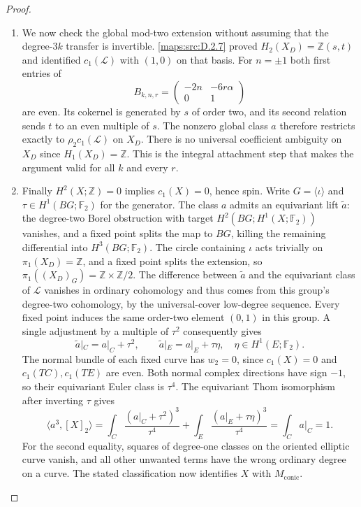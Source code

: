 \begin{proof}
\begin{enumerate}[label=\arabic*.,leftmargin=*]
\item We now check the global mod-two extension without assuming that
the degree-$3k$ transfer is invertible. \ref{maps:src:D.2.7} proved
$H_2(X_D)=\mathbb Z(s,t)$ and identified
$c_1(\mathcal L)$ with $(1,0)$ on that basis.
For $n=\pm1$ both first entries of
\[
 B_{k,n,r}=\begin{pmatrix}-2n&-6r\alpha\\0&1\end{pmatrix}
\]
are even. Its cokernel is generated by $s$ of order two, and
its second relation sends $t$ to an even multiple of $s$.
The nonzero global class $a$ therefore restricts exactly to
$\rho_2c_1(\mathcal L)$ on $X_D$. There is no universal
coefficient ambiguity on $X_D$ since $H_1(X_D)=\mathbb Z$.
This is the integral attachment step that makes the argument
valid for all $k$ and every $r$.

\item Finally $H^2(X;\mathbb Z)=0$ implies $c_1(X)=0$, hence spin.
Write $G=\langle\iota\rangle$ and
$\tau\in H^1(BG;\mathbb F_2)$ for the generator.
The class $a$ admits an equivariant lift $\widetilde a$:
the degree-two Borel obstruction with target
$H^2(BG;H^1(X;\mathbb F_2))$ vanishes, and a fixed point
splits the map to $BG$, killing the remaining differential
into $H^3(BG;\mathbb F_2)$.
The circle containing $\iota$ acts trivially on
$\pi_1(X_D)=\mathbb Z$, and a fixed point splits the extension,
so $\pi_1((X_D)_G)=\mathbb Z\times\mathbb Z/2$.
The difference between $\widetilde a$ and the equivariant
class of $\mathcal L$ vanishes in ordinary cohomology and thus
comes from this group's degree-two cohomology, by the
universal-cover low-degree sequence. Every fixed point induces
the same order-two element $(0,1)$ in this group. A single
adjustment by a multiple of $\tau^2$ consequently gives
\[
 \widetilde a|_C=a|_C+\tau^2,
 \qquad \widetilde a|_E=a|_E+\tau\eta,
 \quad\eta\in H^1(E;\mathbb F_2).
\]
The normal bundle of each fixed curve has $w_2=0$, since
$c_1(X)=0$ and $c_1(TC),c_1(TE)$ are even.
Both normal complex directions have sign $-1$, so their
equivariant Euler class is $\tau^4$.
The equivariant Thom isomorphism after inverting $\tau$ gives
\[
 \langle a^3,[X]_2\rangle
 =\int_C\frac{(a|_C+\tau^2)^3}{\tau^4}
  +\int_E\frac{(a|_E+\tau\eta)^3}{\tau^4}
 =\int_C a|_C=1.
\]
For the second equality, squares of degree-one classes on the
oriented elliptic curve vanish, and all other unwanted terms
have the wrong ordinary degree on a curve. The stated
classification now identifies $X$ with $M_{\mathrm{conic}}$.
\end{enumerate}
\end{proof}

